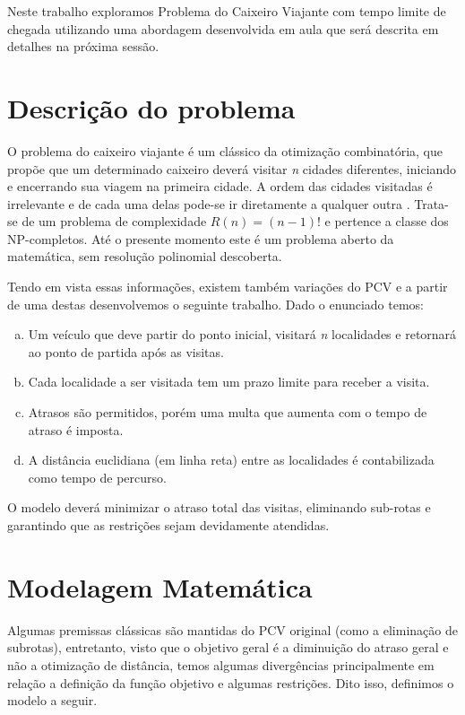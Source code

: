 \documentclass[12pt]{article}
\begin{document}
Neste trabalho exploramos Problema do Caixeiro Viajante com tempo limite de chegada utilizando uma abordagem desenvolvida em aula que será descrita em detalhes na próxima sessão.



\section{Descrição do problema}

O problema do caixeiro viajante é um clássico da otimização combinatória, que propõe que um determinado caixeiro deverá visitar {\it n} cidades diferentes, iniciando e encerrando sua viagem na primeira cidade. A ordem das cidades visitadas é irrelevante e de cada uma delas pode-se ir diretamente a qualquer outra \cite{porto-da-silveira_2000}. Trata-se de um problema de complexidade $R(n) = (n -1)!$ e pertence a classe dos NP-completos. Até o presente momento este é um problema aberto da matemática, sem resolução polinomial descoberta.

Tendo em vista essas informações, existem também variações do PCV e a partir de uma destas desenvolvemos o seguinte trabalho. Dado o enunciado temos:


\begin{enumerate}[(a)]
  \item Um veículo que deve partir do ponto inicial, visitará {\it n} localidades e retornará ao ponto de partida após as visitas.
  \item Cada localidade a ser visitada tem um prazo limite para receber a visita.
  \item Atrasos são permitidos, porém uma multa que aumenta com o tempo de atraso é imposta.
  \item A distância euclidiana (em linha reta) entre as localidades é contabilizada como tempo de percurso.
\end{enumerate}

O modelo deverá minimizar o atraso total das visitas, eliminando sub-rotas e garantindo que as restrições sejam devidamente atendidas.


\section{Modelagem Matemática}
Algumas premissas clássicas são mantidas do PCV original (como a eliminação de subrotas), entretanto, visto que o objetivo geral é a diminuição do atraso geral e não a otimização de distância, temos algumas divergências principalmente em relação a definição da função objetivo e algumas restrições. Dito isso, definimos o modelo a seguir.
\end{document}
